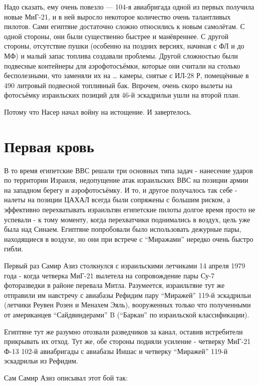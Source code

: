 Надо сказать, ему очень повезло — 104-я авиабригада одной из первых получила новые МиГ-21, и в ней выросло некоторое количество очень талантливых пилотов. Сами египтяне достаточно сложно относились к новым самолётам. С одной стороны, они были существенно быстрее и манёвреннее. С другой стороны, отсутствие пушки (особенно на поздних версиях, начиная с ФЛ и до МФ) и малый запас топлива создавали проблемы. Другой сложностью были подвесные контейнеры для аэрофотосъёмки, которые они считали на столько бесполезными, что заменяли их на … камеры, снятые с ИЛ-28 Р, помещённые в 490 литровый подвесной топливный бак. Впрочем, очень скоро вылеты на фотосъёмку израильских позиций для 46-й эскадрильи ушли на второй план.

Потому что Насер начал войну на истощение. И завертелось.

\section{Первая кровь}

В то время египетские ВВС решали три основных типа задач - нанесение ударов по территории Израиля, недопущение атак израильских ВВС на позиции армии на западном берегу и аэрофотосъёмку. И то, и другое получалось так себе - налеты на позиции ЦАХАЛ всегда были сопряжены с большим риском, а эффективно перехватывать израильтян египетские пилоты долгое время просто не успевали - к тому моменту, когда перехватчики поднимались в воздух, цель уже была над Синаем. Египтяне попробовали было использовать дежурные пары, находящиеся в воздухе, но они при встрече с “Миражами” нередко очень быстро гибли.

Первый раз Самир Азиз столкнулся с израильскими летчиками 14 апреля 1979 года - когда четверка МиГ-21 вылетела на сопровождение пары Су-7 фоторазведки в районе перевала Митла. Разумеется, израильтяне тут же отправили им навстречу с авиабазы Рефидим пару “Миражей” 119-й эскадрильи (летчики Реувен Розен и Менахем Эяль), вооруженных только что полученными от американцев “Сайдвиндерами” B (“Баркан” по израильской классификации).

Египтяне тут же разумно отозвали разведчиков за канал, оставив истребители прикрывать их отход. Тут же, обе стороны подняли усиление - четверку МиГ-21 Ф-13 102-й авиабригады с авиабазы Иншас и четверку “Миражей” 119-й эскадрильи из Рефидим.

Сам Самир Азиз описывал этот бой так:

